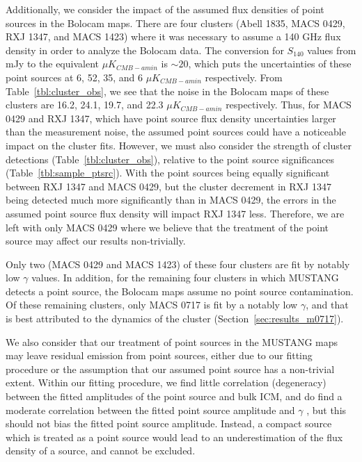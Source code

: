 \documentclass[iop,numberedappendix,apj]{emulateapj}
\begin{document}
Additionally, we consider the impact of the assumed flux densities of point sources in the Bolocam maps. 
There are four clusters (Abell 1835, MACS 0429, RXJ 1347, and MACS 1423) where it was necessary to assume a 140 GHz flux
density in order to analyze the Bolocam data. 
The conversion for $S_{140}$ values from mJy to the equivalent $\mu K_{CMB-amin}$ 
is $\sim20$, which puts the uncertainties of these point sources at 6, 52, 35, and 6 $\mu K_{CMB-amin}$ respectively. 
From Table~\ref{tbl:cluster_obs}, we see that the noise in the Bolocam maps of these clusters are 16.2, 24.1, 19.7, 
and 22.3 $\mu K_{CMB-amin}$ respectively. Thus, for MACS 0429 and RXJ 1347, which have point source flux density 
uncertainties larger than the measurement noise, the assumed point sources could have a noticeable impact on the cluster
fits. However, we must also consider the strength of cluster detections (Table~\ref{tbl:cluster_obs}), 
relative to the point source significances (Table~\ref{tbl:sample_ptsrc}). With the point sources being equally significant
between RXJ 1347 and MACS 0429, but the cluster decrement in RXJ 1347 being detected much more significantly %
than in MACS 0429, the errors in the assumed point source flux density will impact RXJ 1347 less. 
Therefore, we are left with only MACS 0429 where
we believe that the treatment of the point source may affect our results non-trivially.

Only two (MACS 0429 and MACS 1423) of these four clusters are fit by notably low $\gamma$ values.
In addition, for the remaining four clusters in which MUSTANG detects a point source, the Bolocam maps assume no 
point source contamination. Of these remaining clusters, only MACS 0717 is fit by a notably low $\gamma$, and that is best 
attributed to the dynamics of the cluster (Section~\ref{sec:results_m0717}). 

We also consider that our treatment of point sources in the MUSTANG maps may leave residual emission from point sources,
either due to our fitting procedure or the assumption that our assumed point source has a non-trivial extent. Within 
our fitting procedure, we find little correlation (degeneracy) between the fitted amplitudes of the point source and bulk
ICM, and do find a moderate correlation between the fitted point source amplitude and $\gamma$ \citep{romero2015}, but
this should not bias the fitted point source amplitude. Instead, a compact source which is treated as a point source
would lead to an underestimation of the flux density of a source, and cannot be excluded.
\end{document}
